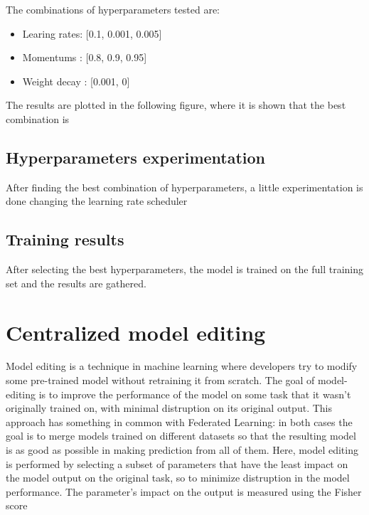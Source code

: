 \documentclass[10pt,twocolumn,letterpaper]{article}
\begin{document}
The combinations of hyperparameters tested are:
\begin{itemize}
	\setlength\itemsep{0.01em}
	\item Learing rates: [0.1, 0.001, 0.005]
	\item Momentums : [0.8, 0.9, 0.95]
	\item Weight decay : [0.001, 0]
\end{itemize}

The results are plotted in the following figure, where it is shown that the best combination is 


	

\subsection{Hyperparameters experimentation}

After finding the best combination of hyperparameters, a little experimentation is done changing the learning rate scheduler



\subsection{Training results}

After selecting the best hyperparameters, the model is trained on the full training set and the results are gathered.













\section{Centralized model editing}

Model editing is a technique in machine learning where developers try to modify some pre-trained model without retraining it from scratch. The goal of model-editing is to improve the performance of the model on some task that it wasn't originally trained on, with minimal distruption on its original output. This approach has something in common with Federated Learning: in both cases the goal is to merge models trained on different datasets so that the resulting model is as good as possible in making prediction from all of them. Here, model editing is performed by selecting a subset of parameters that have the least impact on the model output on the original task, so to minimize distruption in the model performance. The parameter's impact on the output is measured using the Fisher score
\end{document}
